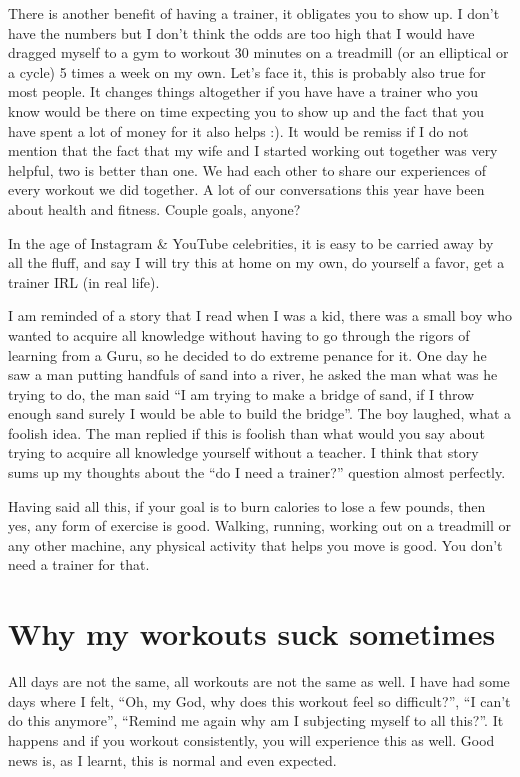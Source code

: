 \documentclass[
  oneside]{book}
\begin{document}
There is another benefit of having a trainer, it obligates you to show up. I don't have the numbers but I don't think the odds are too high that I would have dragged myself to a gym to workout 30 minutes on a treadmill (or an elliptical or a cycle) 5 times a week on my own. Let's face it, this is probably also true for most people. It changes things altogether if you have have a trainer who you know would be there on time expecting you to show up and the fact that you have spent a lot of money for it also helps :). It would be remiss if I do not mention that the fact that my wife and I started working out together was very helpful, two is better than one. We had each other to share our experiences of every workout we did together. A lot of our conversations this year have been about health and fitness. Couple goals, anyone?

In the age of Instagram \& YouTube celebrities, it is easy to be carried away by all the fluff, and say I will try this at home on my own, do yourself a favor, get a trainer IRL (in real life).

I am reminded of a story that I read when I was a kid, there was a small boy who wanted to acquire all knowledge without having to go through the rigors of learning from a Guru, so he decided to do extreme penance for it. One day he saw a man putting handfuls of sand into a river, he asked the man what was he trying to do, the man said ``I am trying to make a bridge of sand, if I throw enough sand surely I would be able to build the bridge''. The boy laughed, what a foolish idea. The man replied if this is foolish than what would you say about trying to acquire all knowledge yourself without a teacher. I think that story sums up my thoughts about the ``do I need a trainer?'' question almost perfectly.

Having said all this, if your goal is to burn calories to lose a few pounds, then yes, any form of exercise is good. Walking, running, working out on a treadmill or any other machine, any physical activity that helps you move is good. You don't need a trainer for that.

\hypertarget{why-my-workouts-suck-sometimes}{%
\section{Why my workouts suck sometimes}\label{why-my-workouts-suck-sometimes}}

All days are not the same, all workouts are not the same as well. I have had some days where I felt, ``Oh, my God, why does this workout feel so difficult?'', ``I can't do this anymore'', ``Remind me again why am I subjecting myself to all this?''. It happens and if you workout consistently, you will experience this as well. Good news is, as I learnt, this is normal and even expected.
\end{document}

